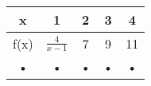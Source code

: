 \documentclass[11pt,a4paper]{article}
\begin{document}
\begin{center}
\begin{huge}

\begin{tabular}{| c| c| c| c| c|}
\hline 
 x & 1  &  2 &  3 & 4  \\ 
\hline 
f(x) & $\frac{4}{x-1}$ & 7 & 9 & 11 \\ 
\hline 
• & • & • & • & • \\ 
\hline 
\end{tabular} 

\end{huge}

\end{center}
\end{document}
